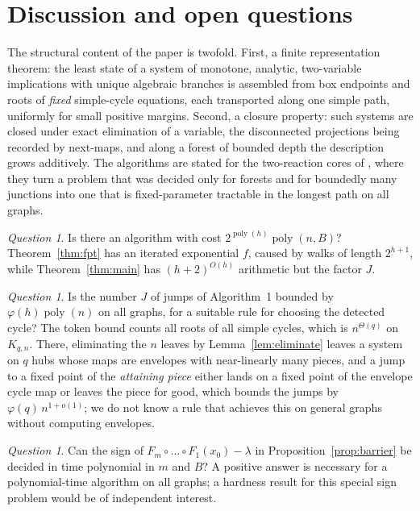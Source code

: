 \documentclass[11pt,a4paper]{article}
\theoremstyle{plain}
\theoremstyle{definition}
\theoremstyle{remark}
\newtheorem{question}[theorem]{Question}
\newcommand{\poly}{\operatorname{poly}}
\begin{document}
\section{Discussion and open questions}\label{sec:discussion}

The structural content of the paper is twofold. First, a finite representation theorem: the least state of a system of monotone, analytic, two-variable implications with unique algebraic branches is assembled from box endpoints and roots of \emph{fixed} simple-cycle equations, each transported along one simple path, uniformly for small positive margins. Second, a closure property: such systems are closed under exact elimination of a variable, the disconnected projections being recorded by next-maps, and along a forest of bounded depth the description grows additively. The algorithms are stated for the two-reaction cores of \citep{kosc2025,tcch2026,jp2026}, where they turn a problem that was decided only for forests and for boundedly many junctions into one that is fixed-parameter tractable in the longest path on all graphs.

\begin{question}
Is there an algorithm with cost $2^{\poly(h)}\poly(n,B)$? Theorem~\ref{thm:fpt} has an iterated exponential $f$, caused by walks of length $2^{h+1}$, while Theorem~\ref{thm:main} has $(h+2)^{O(h)}$ arithmetic but the factor $J$.
\end{question}

\begin{question}
Is the number $J$ of jumps of Algorithm~1 bounded by $\varphi(h)\poly(n)$ on all graphs, for a suitable rule for choosing the detected cycle? The token bound counts all roots of all simple cycles, which is $n^{\Theta(q)}$ on $K_{q,n}$. There, eliminating the $n$ leaves by Lemma~\ref{lem:eliminate} leaves a system on $q$ hubs whose maps are envelopes with near-linearly many pieces, and a jump to a fixed point of the \emph{attaining piece} either lands on a fixed point of the envelope cycle map or leaves the piece for good, which bounds the jumps by $\varphi(q)\,n^{1+o(1)}$; we do not know a rule that achieves this on general graphs without computing envelopes.
\end{question}

\begin{question}
Can the sign of $F_m\circ\dots\circ F_1(x_0)-\lambda$ in Proposition~\ref{prop:barrier} be decided in time polynomial in $m$ and $B$? A positive answer is necessary for a polynomial-time algorithm on all graphs; a hardness result for this special sign problem would be of independent interest.
\end{question}
\end{document}
